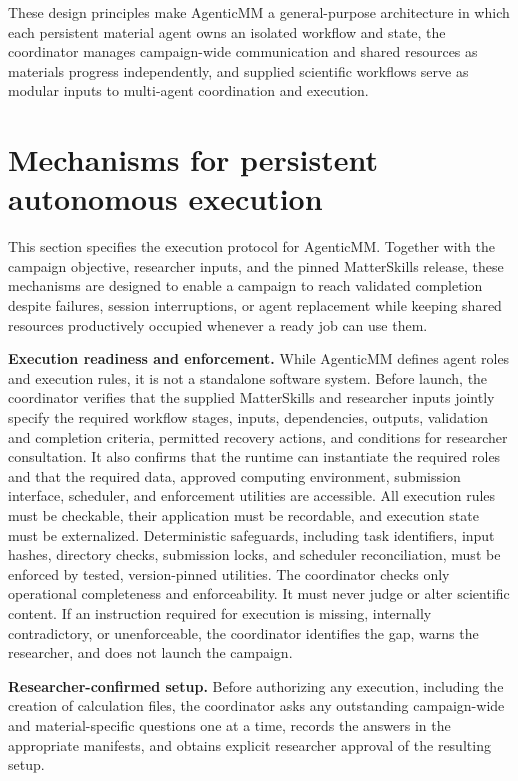 \documentclass[aip,jap,reprint]{revtex4-2}
\begin{document}
These design principles make AgenticMM a general-purpose architecture in which each persistent material agent owns an isolated workflow and state, the coordinator manages campaign-wide communication and shared resources as materials progress independently, and supplied scientific workflows serve as modular inputs to multi-agent coordination and execution.

\section{Mechanisms for persistent autonomous execution}

This section specifies the execution protocol for AgenticMM. Together with the campaign objective, researcher inputs, and the pinned MatterSkills release, these mechanisms are designed to enable a campaign to reach validated completion despite failures, session interruptions, or agent replacement while keeping shared resources productively occupied whenever a ready job can use them.

\noindent\textbf{Execution readiness and enforcement.} While AgenticMM defines agent roles and execution rules, it is not a standalone software system. Before launch, the coordinator verifies that the supplied MatterSkills and researcher inputs jointly specify the required workflow stages, inputs, dependencies, outputs, validation and completion criteria, permitted recovery actions, and conditions for researcher consultation. It also confirms that the runtime can instantiate the required roles and that the required data, approved computing environment, submission interface, scheduler, and enforcement utilities are accessible. All execution rules must be checkable, their application must be recordable, and execution state must be externalized. Deterministic safeguards, including task identifiers, input hashes, directory checks, submission locks, and scheduler reconciliation, must be enforced by tested, version-pinned utilities. The coordinator checks only operational completeness and enforceability. It must never judge or alter scientific content. If an instruction required for execution is missing, internally contradictory, or unenforceable, the coordinator identifies the gap, warns the researcher, and does not launch the campaign.

\noindent\textbf{Researcher-confirmed setup.} Before authorizing any execution, including the creation of calculation files, the coordinator asks any outstanding campaign-wide and material-specific questions one at a time, records the answers in the appropriate manifests, and obtains explicit researcher approval of the resulting setup.
\end{document}
